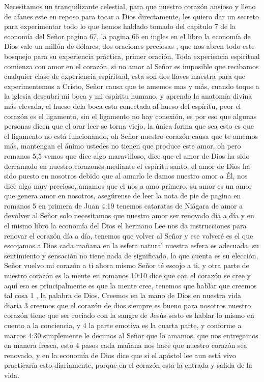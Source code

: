 \documentclass[12pt]{article}
\begin{document}
Necesitamos un tranquilizante celestial, para que nuestro corazón ansioso y lleno de afanes este en reposo para tocar a Dios directamente, les quiero dar un secreto para experimentar todo lo que hemos hablado tomado del capitulo 7 de la economía del Señor pagina 67, la pagina 66 en ingles en el libro la economía de Dios vale un millón de dólares, dos oraciones preciosas , que nos abren todo este bosquejo para su experiencia práctica, primer oración, Toda experiencia espiritual comienza con amor en el corazón, si no amor al Señor es imposible que recibamos cualquier clase de experiencia espiritual, esta son dos llaves maestra para que experimentemos a Cristo, Señor causa que te amemos mas y más, cuando toque a la iglesia descubrí mi boca y mi espíritu humano, y aprendo la anatomía divina más elevada, el hueso dela boca esta conectada al hueso del espíritu, peor el corazón es el ligamento, sin el ligamento no hay conexión, es por eso que algunas personas dicen que el orar leer se torna viejo, la única forma que sea esto es que el ligamento no está funcionando, oh Señor nuestro corazón  causa que te amemos más, mantengan el ánimo ustedes no tienen que produce este amor, oh pero romanos 5,5 vemos que  dice algo maravilloso, dice que el amor de Dios ha sido derramado en nuestro corazones mediante el espíritu santo, el amor de Dios ha sido puesto en nosotros debido que al amarlo le damos nuestro amor a Él, nos dice algo muy precioso, amamos que el nos a amo primero, su amor es un amor que genera amor en nosotros, asegúrense de leer la nota de pie de pagina en romanos 5 en primera de Juan 4:19 tenemos cataratas de Niágara de amor a devolver al Señor solo necesitamos que nuestro amor ser renovado día a día y en el mismo libro la economía del Dios el hermano Lee nos da instrucciones para renovar el corazón día a día, tenemos que volver al Señor y ese volveré es el que escojamos a Dios cada mañana en la esfera natural nuestra esfera es adecuada, su sentimiento y sensación no tiene nada de significado, lo que cuenta es su elección, Señor vuelvo mi corazón a ti ahora mismo Señor té escojo a ti, y otra parte de nuestro corazón es la mente en romanos 10:10 dice que con el corazón se cree y aquí eso es principalmente es que la mente cree, tenemos que hablar que creemos tal cosa 1 , la palabra de Dios. Creemos en la mano de Dios en nuestra vida diaria 3 creemos que el corazón de dios siempre es bueno para nosotros nuestro corazón tiene que ser rociado con la sangre de Jesús sesto es hablar lo mismo en cuento a la conciencia, y 4 la parte emotiva es la cuarta parte, y conforme a marcos 4:30 simplemente le decimos al Señor que lo amamos, que nos entregamos en manera fresca, esto 4 pasos cada mañana nos hace que nuestro corazón sea renovado, y en la economía de Dios dice que si el apóstol lee aun está vivo practicaría esto diariamente, porque en el corazón esta la entrada y salida de la vida.\\
\end{document}
